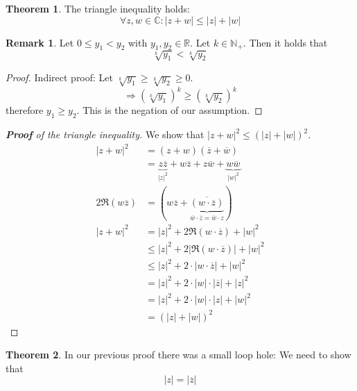 \documentclass[a4paper,landscape,twocolumn]{article}
\theoremstyle{definition}
\newtheorem{theorem}{Theorem}
\newtheorem{rem}{Remark}
\newcommand\abs[1]{\left|#1\right|}
\begin{document}
\begin{theorem}
  The triangle inequality holds:
  \[ \forall z, w \in \mathbb C: \abs{z + w} \leq \abs{z} + \abs{w} \]
\end{theorem}

\begin{rem}
  Let $0 \leq y_1 < y_2$ with $y_1, y_2 \in \mathbb R$.
  Let $k \in \mathbb N_+$. Then it holds that
  \[ \sqrt[k]{y_1} < \sqrt[k]{y_2} \]
\end{rem}

\begin{proof}
  Indirect proof: Let $\sqrt[k]{y_1} \geq \sqrt[k]{y_2} \geq 0$.
  \[ \Rightarrow \left(\sqrt[k]{y_1}\right)^k \geq \left(\sqrt[k]{y_2}\right)^k \]
  therefore $y_1 \geq y_2$. This is the negation of our assumption.
\end{proof}

\begin{proof}[\textbf{Proof} of the triangle inequality]
  We show that $\abs{z + w}^2 \leq \left(\abs{z} + \abs{w}\right)^2$.
  \begin{align*}
    \abs{z + w}^2
      &= (z + w)(\overline z + \overline w) \\
      &= \underbrace{z \overline z}_{\abs{z}^2} + w \overline z + z \overline w + \underbrace{w \overline w}_{\abs{w}^2} \\
  2 \Re{(w \overline{z})} &= (w \overline{z} + \underbrace{\overline{(w \cdot \overline z)}}_{\overline w \cdot \overline z = \overline w \cdot z}) \\
    \abs{z + w}^2
      &= \abs{z}^2 + 2\Re{(w \cdot \overline z)} + \abs{w}^2 \\
      &\leq \abs{z}^2 + 2\abs{\Re{(w \cdot \overline z)}} + \abs{w}^2 \\
      &\leq \abs{z}^2 + 2 \cdot \abs{w \cdot \overline{z}} + \abs{w}^2 \\
      &= \abs{z}^2 + 2 \cdot \abs{w} \cdot \abs{\overline{z}} + \abs{z}^2 \\
      &= \abs{z}^2 + 2 \cdot \abs{w} \cdot \abs{z} + \abs{w}^2 \\
      &= \left(\abs{z} + \abs{w}\right)^2
  \end{align*}
\end{proof}

\begin{theorem}
  In our previous proof there was a small loop hole: We need to show that
  \[ \abs{z} = \abs{\overline z} \]
\end{theorem}
\end{document}
